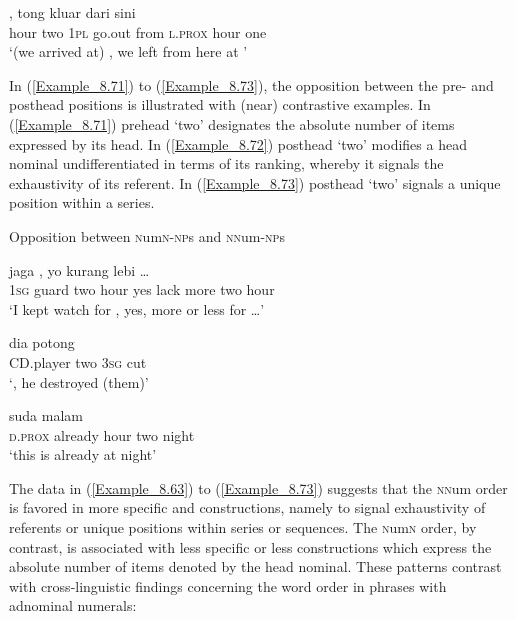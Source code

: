 \ea
\label{Example_8.70}
 {,} {tong} {kluar} {dari} {sini} {} {}\\ %
 hour  two  \textsc{1pl}  go.out  from  \textsc{l.prox}  hour  one\\
\glt 
‘(we arrived at) , we left from here at ’ \textstyleExampleSource{[081025-008-Cv.0099]}
\z


In (\ref{Example_8.71}) to (\ref{Example_8.73}), the opposition between the pre- and posthead positions is illustrated with (near) contrastive examples. In (\ref{Example_8.71}) prehead  ‘two’ designates the absolute number of items expressed by its head. In (\ref{Example_8.72}) posthead  ‘two’ modifies a head nominal undifferentiated in terms of its ranking, whereby it signals the exhaustivity of its referent. In (\ref{Example_8.73}) posthead  ‘two’ signals a unique position within a series.



\begin{styleExampleTitle}
Opposition between \textsc{n}um\textsc{n-np}s and \textsc{nn}um\textsc{{}-np}s
\end{styleExampleTitle}
\ea
\label{Example_8.71}
 {jaga} {} {,} {yo} {kurang} {lebi} {} {} {\ldots}\\ %
 \textsc{1sg}  guard  two  hour  yes  lack  more  two  hour  \\
\glt 
‘I kept watch for , yes, more or less for  {\ldots}’ \textstyleExampleSource{[080919-004-NP.0016]}
\z

\ea
\label{Example_8.72}
 {} {dia} {potong}\\ %
 CD.player  two  \textsc{3sg}  cut\\
\glt 
‘, he destroyed (them)’ \textstyleExampleSource{[081011-009-Cv.0006]}
\z

\ea
\label{Example_8.73}
 {suda} {} {} {malam}\\ %
 \textsc{d.prox}  already  hour  two  night\\
\glt 
‘this is already  at night’ \textstyleExampleSource{[080916-001-CvNP.0001]}
\z


The data in (\ref{Example_8.63}) to (\ref{Example_8.73}) suggests that the \textsc{nn}um order is favored in more specific and  constructions, namely to signal exhaustivity of  referents or unique positions within series or sequences. The \textsc{n}um\textsc{n} order, by contrast, is associated with less specific or less  constructions which express the absolute number of items denoted by the head nominal. These patterns contrast with  cross-linguistic findings concerning the word order in  phrases with adnominal numerals:



